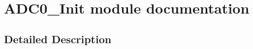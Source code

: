 \hypertarget{group___a_d_c0___init__module}{}\section{A\+D\+C0\+\_\+\+Init module documentation}
\label{group___a_d_c0___init__module}


\subsection{Detailed Description}
